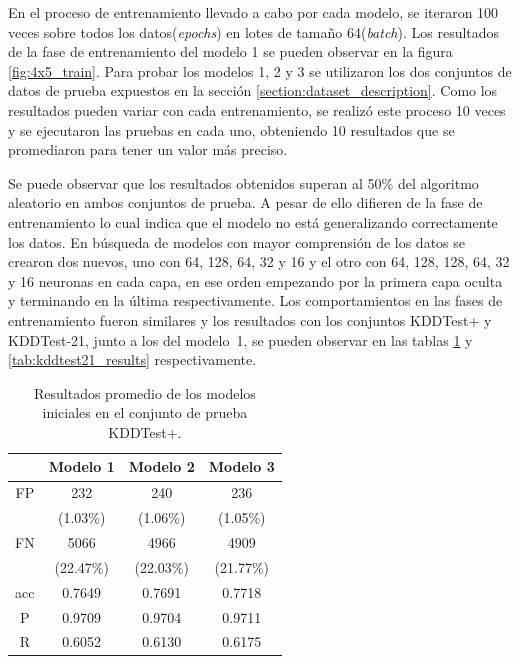 En el proceso de entrenamiento llevado a cabo por cada modelo, se iteraron 100 veces sobre todos los datos(\textit{epochs}) en lotes de tamaño 64(\textit{batch}). Los resultados de la fase de entrenamiento del modelo 1 se pueden observar en la figura \ref{fig:4x5_train}. Para probar los modelos 1, 2 y 3 se utilizaron los dos conjuntos de datos de prueba expuestos en la sección \ref{section:dataset_description}. Como los resultados pueden variar con cada entrenamiento, se realizó este proceso 10 veces y se ejecutaron las pruebas en cada uno, obteniendo 10 resultados que se promediaron para tener un valor m\'as preciso.

Se puede observar que los resultados obtenidos superan al 50\% del algoritmo aleatorio en ambos conjuntos de prueba. A pesar de ello difieren de la fase de entrenamiento lo cual indica que el modelo no está generalizando correctamente los datos. En búsqueda de modelos con mayor comprensión de los datos se crearon dos nuevos, uno con 64, 128, 64, 32 y 16 y el otro con 64, 128, 128, 64, 32 y 16 neuronas en cada capa, en ese orden empezando por la primera capa oculta y terminando en la última respectivamente. Los comportamientos en las fases de entrenamiento fueron similares y los resultados con los conjuntos KDDTest+ y KDDTest-21, junto a los del modelo~1, se pueden observar en las tablas \ref{tab:kddtest+_results} y \ref{tab:kddtest21_results} respectivamente.

\begin{table}[h!b]
    \begin{center}
        \label{tab:kddtest+_results}
        \begin{tabular}{c|c|c|c} %
        \textbf{} & \textbf{Modelo 1} & \textbf{Modelo 2} & \textbf{Modelo 3}\\
        \hline
        FP & 232 & 240 & 236\\
        &(1.03\%)&(1.06\%)&(1.05\%)\\
        FN & 5066 & 4966 & 4909\\
        &(22.47\%)&(22.03\%)&(21.77\%)\\
        acc & 0.7649 & 0.7691 & 0.7718\\
        P & 0.9709 & 0.9704 & 0.9711\\
        R & 0.6052 & 0.6130 & 0.6175\\
        \end{tabular}

        \caption{Resultados promedio de los modelos iniciales en el conjunto de prueba KDDTest+.}
    \end{center}
\end{table}

